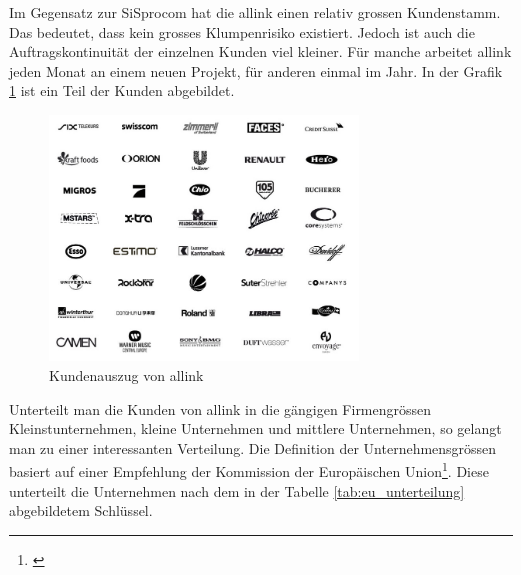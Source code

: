 Im Gegensatz zur SiSprocom hat die allink einen relativ grossen Kundenstamm.
Das bedeutet, dass kein grosses Klumpenrisiko existiert. Jedoch ist auch
die Auftragskontinuität der einzelnen Kunden viel kleiner. Für manche arbeitet
allink jeden Monat an einem neuen Projekt, für anderen einmal im Jahr.
In der Grafik \ref{pic:kundenauszug} ist ein Teil der Kunden abgebildet.

\begin{figure}[htbp]
\begin{center}
\includegraphics[width=0.73\textwidth,angle=0]{./bilder/analyse/kundenauszug.jpg}
\caption[Kundenauszug von allink]{Kundenauszug von allink\footnotemark}
\label{pic:kundenauszug}
\end{center}
\end{figure}

Unterteilt man die Kunden von allink in die gängigen Firmengrössen Kleinstunternehmen,
kleine Unternehmen und mittlere Unternehmen, so gelangt man zu einer interessanten 
Verteilung. Die Definition der Unternehmensgrössen basiert auf einer Empfehlung
der Kommission der Europäischen Union\footnote{\citealp*[Vgl.][Anhang Art. 2]{eu_komission_unternehmen}}.
Diese unterteilt die Unternehmen nach dem in der Tabelle \ref{tab:eu_unterteilung} 
abgebildetem Schlüssel.

